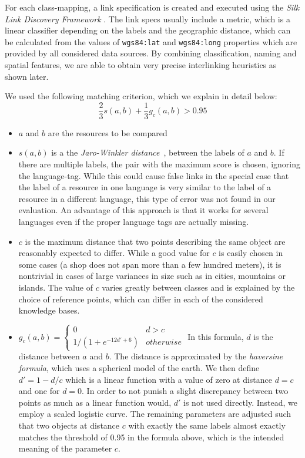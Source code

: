 For each class-mapping, a link specification is created and executed using the \emph{Silk Link Discovery Framework} \cite{silk}.
The link specs usually include a metric, which is a linear classifier depending on the labels and the geographic distance,
which can be calculated from the values of \nolinkurl{wgs84:lat} and \nolinkurl{wgs84:long} properties which are provided by all considered data sources.
By combining classification, naming and spatial features, we are able to obtain very precise interlinking heuristics as shown later.

We used the following matching criterion, which we explain in detail below:
\[\frac{2}{3} s(a,b) + \frac{1}{3} g_c(a,b) > 0.95\]

\begin{itemize}
 \item $a$ and $b$ are the resources to be compared
 \item $s(a,b)$ is a the \emph{Jaro-Winkler distance}~\cite{WIN99}, between the
 labels of $a$ and $b$. If there are multiple labels, the pair with the maximum score is chosen, ignoring the language-tag.
While this could cause false links in the special case that the label of a
resource in one language is very similar to the label of a resource in a
different language, this type of error was not found in our evaluation.
An advantage of this approach is that it works for several languages even if the proper language tags are actually missing.
 \item $c$ is the maximum distance that two points describing the same object are reasonably expected to differ.
While a good value for $c$ is easily chosen in some cases (a shop does not span more than a few hundred meters), it is nontrivial in cases of large variances
in size such as in cities, mountains or islands.
The value of $c$ varies greatly between classes and is explained by the choice of reference points, which can differ in each of the considered knowledge bases.
 \item $g_c(a,b) =
\begin{cases}
0 & d > c \\
1/(1+e^{-12d'+6}) & otherwise
\end{cases}$
In this formula, $d$ is the distance between $a$ and $b$. The distance is approximated by the \emph{haversine formula}, which uses a spherical model of the earth.
We then define $d' = 1 - d/c$ which is a linear function with a value of zero at distance $d=c$ and one for $d=0$.
In order to not punish a slight discrepancy between two points as much as a linear function would, $d'$ is not used directly.
Instead, we employ a scaled logistic curve. The remaining parameters are adjusted such that two objects at distance $c$ with exactly the same labels almost exactly matches the threshold of 0.95 in the formula above, which is the intended meaning of the parameter $c$.
\end{itemize}

